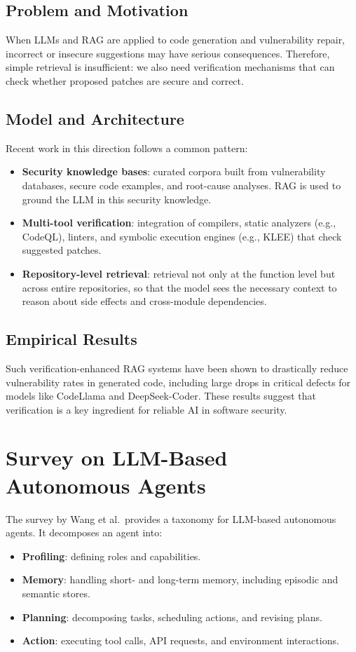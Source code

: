 \documentclass[11pt,a4paper]{article}
\begin{document}
\subsection{Problem and Motivation}

When LLMs and RAG are applied to code generation and vulnerability repair, incorrect or insecure suggestions may have serious consequences. Therefore, simple retrieval is insufficient: we also need verification mechanisms that can check whether proposed patches are secure and correct.

\subsection{Model and Architecture}

Recent work in this direction follows a common pattern:
\begin{itemize}[leftmargin=1.2cm]
  \item \textbf{Security knowledge bases}: curated corpora built from vulnerability databases, secure code examples, and root-cause analyses. RAG is used to ground the LLM in this security knowledge.
  \item \textbf{Multi-tool verification}: integration of compilers, static analyzers (e.g., CodeQL), linters, and symbolic execution engines (e.g., KLEE) that check suggested patches.
  \item \textbf{Repository-level retrieval}: retrieval not only at the function level but across entire repositories, so that the model sees the necessary context to reason about side effects and cross-module dependencies.
\end{itemize}

\subsection{Empirical Results}

Such verification-enhanced RAG systems have been shown to drastically reduce vulnerability rates in generated code, including large drops in critical defects for models like CodeLlama and DeepSeek-Coder. These results suggest that verification is a key ingredient for reliable AI in software security.

\section{Survey on LLM-Based Autonomous Agents}

The survey by Wang et al.\ provides a taxonomy for LLM-based autonomous agents. It decomposes an agent into:
\begin{itemize}[leftmargin=1.2cm]
  \item \textbf{Profiling}: defining roles and capabilities.
  \item \textbf{Memory}: handling short- and long-term memory, including episodic and semantic stores.
  \item \textbf{Planning}: decomposing tasks, scheduling actions, and revising plans.
  \item \textbf{Action}: executing tool calls, API requests, and environment interactions.
\end{itemize}
\end{document}
